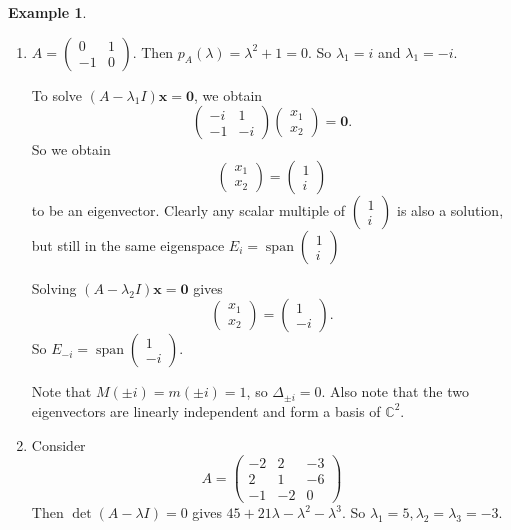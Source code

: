 \documentclass[a4paper]{article}
\theoremstyle{definition}
\newtheorem*{eg}{Example}
\newcommand{\mb}[1]{\mathbf{#1}}
\newcommand{\C}{\mathbb{C}}
\DeclareMathOperator\spn{span}
\begin{document}
\begin{eg}\leavevmode
  \begin{enumerate}
  \item $A = \begin{pmatrix} 0 & 1\\
    -1 & 0
  \end{pmatrix}$. Then $p_A(\lambda) = \lambda^2 + 1 = 0$. So $\lambda_1 = i$ and $\lambda_1 = -i$.

    To solve $(A - \lambda_1 I)\mb{x} = \mb{0}$, we obtain
    \[
    \begin{pmatrix}
      -i & 1\\-1 & -i
    \end{pmatrix}
    \begin{pmatrix}
      x_1\\x_2
    \end{pmatrix}
     = \mb{0}.
     \]
     So we obtain
     \[
     \begin{pmatrix}
       x_1\\x_2
     \end{pmatrix} =
     \begin{pmatrix}
       1\\i
     \end{pmatrix}
     \]
     to be an eigenvector. Clearly any scalar multiple of $\begin{pmatrix}
       1\\i
     \end{pmatrix}$ is also a solution, but still in the same eigenspace $E_i = \spn \begin{pmatrix}
       1\\i
     \end{pmatrix}$

     Solving $(A - \lambda_2I)\mb{x} = \mb{0}$ gives 
     \[
     \begin{pmatrix}
       x_1\\x_2
     \end{pmatrix} =
     \begin{pmatrix}
       1\\-i
     \end{pmatrix}.
     \]
     So $E_{-i} = \spn
     \begin{pmatrix}
       1\\-i
     \end{pmatrix}$.

     Note that $M(\pm i) = m(\pm i) = 1$, so $\Delta_{\pm i} = 0$. Also note that the two eigenvectors are linearly independent and form a basis of $\C^2$.
   \item Consider
     \[
     A = \begin{pmatrix}
     -2 & 2 & -3\\
     2 & 1 & -6\\
     -1 & -2 & 0
     \end{pmatrix}
     \]
     Then $\det(A - \lambda I) = 0$ gives $45 + 21\lambda - \lambda^2 - \lambda^3$. So $\lambda_1 = 5, \lambda_2 = \lambda_3 = -3$.


\end{enumerate}
\end{eg}
\end{document}
